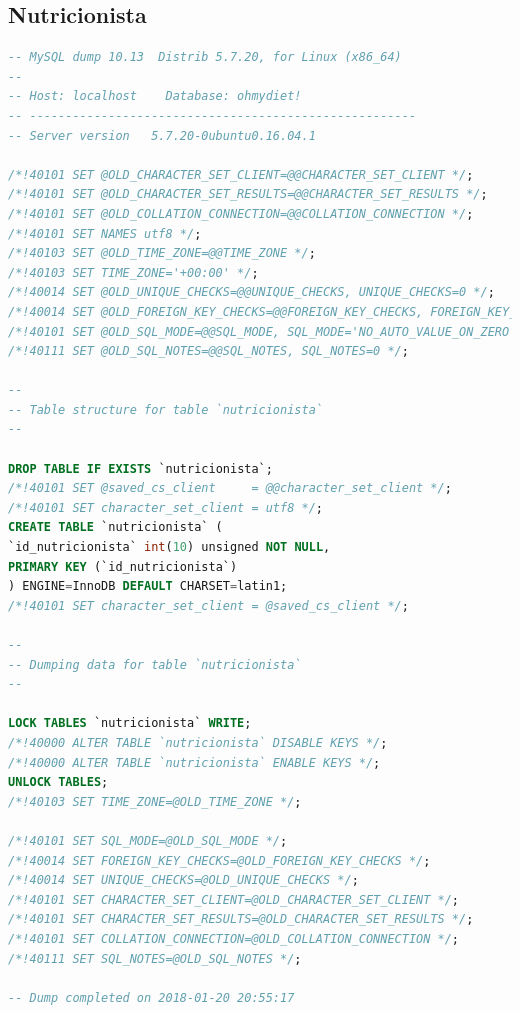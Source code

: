 \documentclass[12pt,letterpaper]{article}
\begin{document}
\subsection{Nutricionista}
\begin{lstlisting}[language=sql]
-- MySQL dump 10.13  Distrib 5.7.20, for Linux (x86_64)
--
-- Host: localhost    Database: ohmydiet!
-- ------------------------------------------------------
-- Server version	5.7.20-0ubuntu0.16.04.1

/*!40101 SET @OLD_CHARACTER_SET_CLIENT=@@CHARACTER_SET_CLIENT */;
/*!40101 SET @OLD_CHARACTER_SET_RESULTS=@@CHARACTER_SET_RESULTS */;
/*!40101 SET @OLD_COLLATION_CONNECTION=@@COLLATION_CONNECTION */;
/*!40101 SET NAMES utf8 */;
/*!40103 SET @OLD_TIME_ZONE=@@TIME_ZONE */;
/*!40103 SET TIME_ZONE='+00:00' */;
/*!40014 SET @OLD_UNIQUE_CHECKS=@@UNIQUE_CHECKS, UNIQUE_CHECKS=0 */;
/*!40014 SET @OLD_FOREIGN_KEY_CHECKS=@@FOREIGN_KEY_CHECKS, FOREIGN_KEY_CHECKS=0 */;
/*!40101 SET @OLD_SQL_MODE=@@SQL_MODE, SQL_MODE='NO_AUTO_VALUE_ON_ZERO' */;
/*!40111 SET @OLD_SQL_NOTES=@@SQL_NOTES, SQL_NOTES=0 */;

--
-- Table structure for table `nutricionista`
--

DROP TABLE IF EXISTS `nutricionista`;
/*!40101 SET @saved_cs_client     = @@character_set_client */;
/*!40101 SET character_set_client = utf8 */;
CREATE TABLE `nutricionista` (
`id_nutricionista` int(10) unsigned NOT NULL,
PRIMARY KEY (`id_nutricionista`)
) ENGINE=InnoDB DEFAULT CHARSET=latin1;
/*!40101 SET character_set_client = @saved_cs_client */;

--
-- Dumping data for table `nutricionista`
--

LOCK TABLES `nutricionista` WRITE;
/*!40000 ALTER TABLE `nutricionista` DISABLE KEYS */;
/*!40000 ALTER TABLE `nutricionista` ENABLE KEYS */;
UNLOCK TABLES;
/*!40103 SET TIME_ZONE=@OLD_TIME_ZONE */;

/*!40101 SET SQL_MODE=@OLD_SQL_MODE */;
/*!40014 SET FOREIGN_KEY_CHECKS=@OLD_FOREIGN_KEY_CHECKS */;
/*!40014 SET UNIQUE_CHECKS=@OLD_UNIQUE_CHECKS */;
/*!40101 SET CHARACTER_SET_CLIENT=@OLD_CHARACTER_SET_CLIENT */;
/*!40101 SET CHARACTER_SET_RESULTS=@OLD_CHARACTER_SET_RESULTS */;
/*!40101 SET COLLATION_CONNECTION=@OLD_COLLATION_CONNECTION */;
/*!40111 SET SQL_NOTES=@OLD_SQL_NOTES */;

-- Dump completed on 2018-01-20 20:55:17

\end{lstlisting}
\end{document}
